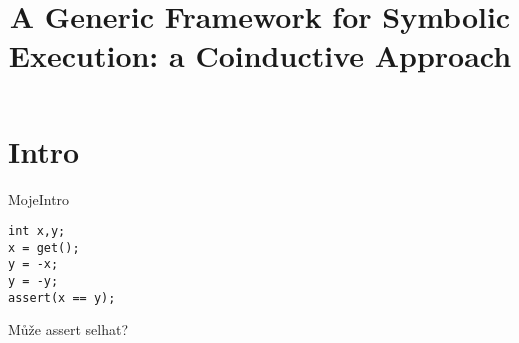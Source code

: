 \documentclass[11pt]{beamer}
\title{A Generic Framework for Symbolic Execution: a Coinductive Approach}
\begin{document}
\begin{frame}
\titlepage
\end{frame}

\begin{frame}
\tableofcontents
\end{frame}



\section{Intro}


\begin{frame}[fragile=singleslide]{MojeIntro}

\begin{lstlisting}
int x,y;
x = get();
y = -x;
y = -y;
assert(x == y);
\end{lstlisting}

Může assert selhat?

\end{frame}
\end{document}
